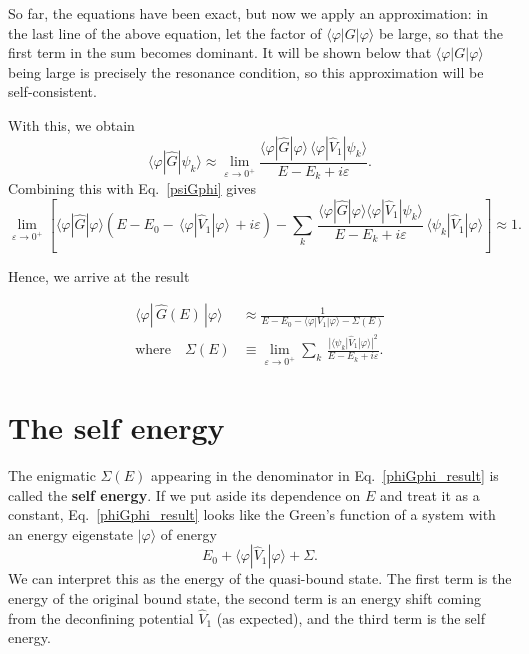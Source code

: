 \documentclass[pra,12pt]{revtex4}
\begin{document}
So far, the equations have been exact, but now we apply an
approximation: in the last line of the above equation, let the factor
of $\langle\varphi|G|\varphi\rangle$ be large, so that the first term
in the sum becomes dominant.  It will be shown below that
$\langle\varphi|G|\varphi\rangle$ being large is precisely the
resonance condition, so this approximation will be self-consistent.

With this, we obtain
\begin{equation}
  \langle\varphi|\hat{G}|\psi_k\rangle \approx \lim_{\varepsilon\rightarrow0^+} \frac{\langle\varphi|\hat{G}|\varphi\rangle \, \langle\varphi|\hat{V}_1|\psi_k\rangle}{E-E_k+i\varepsilon}.
  \label{phiGpsi}
\end{equation}
Combining this with Eq.~\eqref{psiGphi} gives
\begin{equation*}
  \lim_{\varepsilon\rightarrow0^+} \left[\langle\varphi|\hat{G}|\varphi\rangle \left(E - E_0 -\, \langle\varphi|\hat{V}_1|\varphi\rangle \, + i\varepsilon\right) - \sum_k\, \frac{\langle\varphi|\hat{G}|\varphi\rangle\langle\varphi|\hat{V}_1|\psi_k\rangle}{E-E_k+i\varepsilon} \, \langle\psi_k| \hat{V}_1|\varphi\rangle\right] \approx 1.
\end{equation*}

Hence, we arrive at the result
\begin{framed}
  \begin{align}
    \langle\varphi|\,\hat{G}(E)\,|\varphi\rangle
    &\approx \frac{1}{\displaystyle E - E_0 - \langle\varphi|V_1|\varphi\rangle - \Sigma(E)}
    \label{phiGphi_result} \\
    \mathrm{where}\quad
    \Sigma(E) &\equiv \lim_{\varepsilon\rightarrow0^+}
    \sum_k \, \frac{\displaystyle| \langle\psi_k| \hat{V}_1|\varphi\rangle|^2}{\displaystyle E-E_k+i\varepsilon}.
    \label{sigma}
  \end{align}
\end{framed}

\section{The self energy}
\label{sec:self_energy}

The enigmatic $\Sigma(E)$ appearing in the denominator in
Eq.~\eqref{phiGphi_result} is called the \textbf{self energy}.  If we
put aside its dependence on $E$ and treat it as a constant,
Eq.~\eqref{phiGphi_result} looks like the Green's function of a system
with an energy eigenstate $|\varphi\rangle$ of energy
\begin{equation*}
  E_0 + \langle\varphi|\hat{V}_1|\varphi\rangle + \Sigma.
\end{equation*}
We can interpret this as the energy of the quasi-bound state.  The
first term is the energy of the original bound state, the second term
is an energy shift coming from the deconfining potential $\hat{V}_1$
(as expected), and the third term is the self energy.
\end{document}
